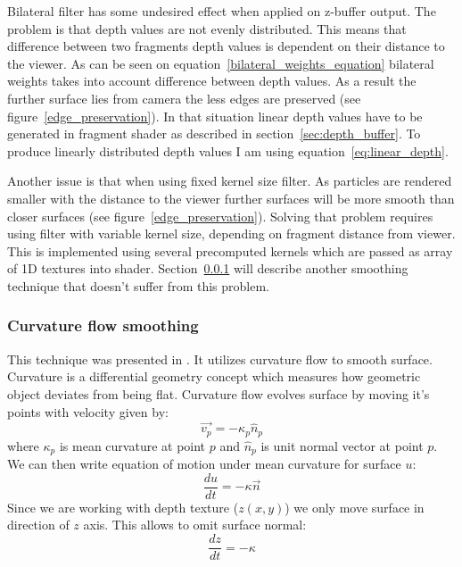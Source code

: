 Bilateral filter has some undesired effect when applied on z-buffer output. The problem is that depth values are not evenly distributed. This means that difference between two fragments depth values is dependent on their distance to the viewer. As can be seen on equation~\ref{bilateral_weights_equation} bilateral weights takes into account difference between depth values. As a result the further surface lies from camera the less edges are preserved (see figure~\ref{edge_preservation}). In that situation linear depth values have to be generated in fragment shader as described in section~\ref{sec:depth_buffer}. To produce linearly distributed depth values I am using equation~\ref{eq:linear_depth}.

Another issue is that when using fixed kernel size filter. As particles are rendered smaller with the distance to the viewer further surfaces will be more smooth than closer surfaces (see figure~\ref{edge_preservation}). Solving that problem requires using filter with variable kernel size, depending on fragment distance from viewer. This is implemented using several precomputed kernels which are passed as array of 1D textures into shader. Section~\ref{sec:curvatureflowsmoothing} will describe another smoothing technique that doesn't suffer from this problem. 

\subsubsection{Curvature flow smoothing} \label{sec:curvatureflowsmoothing}
This technique was presented in \cite{laanSainz2009}. It utilizes curvature flow to smooth surface. Curvature is a differential geometry concept which measures how geometric object deviates from being flat. Curvature flow evolves surface by moving it's points with velocity given by:
\begin{equation}
\vec{v_p} = -\kappa_p \hat{n}_p
\end{equation}
where $\kappa_p$ is mean curvature at point $p$ and $\hat{n}_p$ is unit normal vector at point $p$.
We can then write equation of motion under mean curvature for surface $u$:
\begin{equation}
\label{eq:curvature_flow}
\frac{du}{dt} = -\kappa \vec{n}
\end{equation}
Since we are working with depth texture ($z(x, y)$) we only move surface in direction of $z$ axis. This allows to omit surface normal:
\begin{equation}
\label{eq:curvature_flow_z}
\frac{dz}{dt} = -\kappa
\end{equation}


